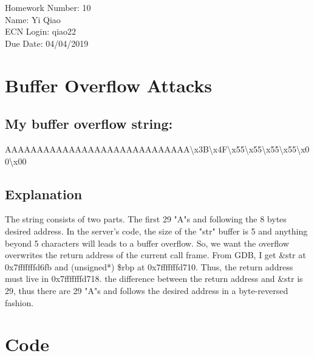 \documentclass[11pt]{article}
\begin{document}
\noindent Homework Number: 10\\
Name: Yi Qiao\\
ECN Login: qiao22\\
Due Date: 04/04/2019\\

\section*{Buffer Overflow Attacks}
\subsection*{My buffer overflow string:}
AAAAAAAAAAAAAAAAAAAAAAAAAAAAA\textbackslash x3B\textbackslash x4F\textbackslash x55\textbackslash x55\textbackslash x55\textbackslash x55\textbackslash x00\textbackslash x00
\subsection*{Explanation}
The string consists of two parts. The first 29 "A"s and following the 8 bytes desired address. In the server's code, the size of the "str" buffer is 5 and anything beyond 5 characters will leads to a buffer overflow. So, we want the overflow overwrites the return address of the current call frame. From GDB, I get \&str at 0x7fffffffd6fb and (unsigned*) \$rbp at 0x7fffffffd710. Thus, the return address must live in 0x7fffffffd718. the difference between the return address and \&str is 29, thus there are 29 "A"s and follows the desired address in a byte-reversed fashion.

\section*{Code}
\inputminted[breaklines]{c}{server.c}
\end{document}
